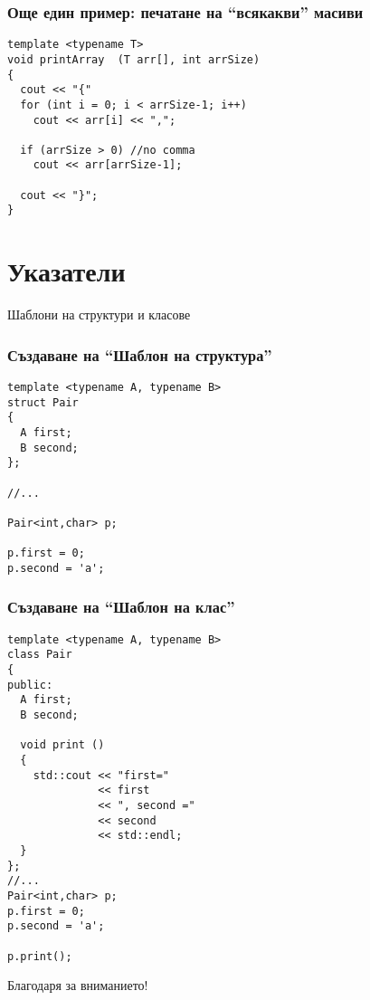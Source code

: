 \documentclass{beamer}
\begin{document}
\begin{frame}[fragile]
\frametitle{Още един пример: печатане на ``всякакви'' масиви}


\begin{flushleft}
\begin{lstlisting}
template <typename T>
void printArray  (T arr[], int arrSize)
{
  cout << "{"
  for (int i = 0; i < arrSize-1; i++)
    cout << arr[i] << ",";

  if (arrSize > 0) //no comma
    cout << arr[arrSize-1];

  cout << "}";
}
\end{lstlisting}
\end{flushleft}

\end{frame}

\section{Указатели}

\begin{frame}
\centerline{Шаблони на структури и класове}
\end{frame}

\begin{frame}[fragile]
\frametitle{Създаване на ``Шаблон на структура''}


\begin{flushleft}
\begin{lstlisting}
template <typename A, typename B>
struct Pair
{
  A first;
  B second;
};

//...

Pair<int,char> p;

p.first = 0;
p.second = 'a';
\end{lstlisting}
\end{flushleft}

\end{frame}

\begin{frame}[fragile]
\frametitle{Създаване на ``Шаблон на клас''}


\begin{flushleft}
\begin{lstlisting}
template <typename A, typename B>
class Pair
{
public:
  A first;
  B second;

  void print ()
  {
    std::cout << "first="
              << first
              << ", second ="
              << second
              << std::endl;
  }
};
//...
Pair<int,char> p;
p.first = 0;
p.second = 'a';

p.print();
\end{lstlisting}
\end{flushleft}

\end{frame}



\begin{frame}
\centerline{Благодаря за вниманието!}
\end{frame}
\end{document}
